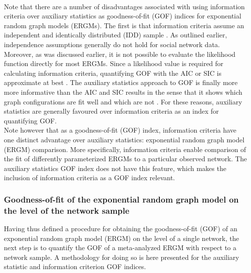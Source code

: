 \documentclass[a4paper, man]{apa6}
\begin{document}
\\
Note that there are a number of disadvantages associated with using information criteria over auxiliary statistics as goodness-of-fit (GOF) indices for exponential random graph models (ERGMs). The first is that information criteria assume an independent and identically distributed (IDD) sample \cite{wit2012all}. As outlined earlier, independence assumptions generally do not hold for social network data. Moreover, as was discussed earlier, it is not possible to evaluate the likelihood function directly for most ERGMs. Since a likelihood value is required for calculating information criteria, quantifying GOF with the AIC or SIC is approximate at best \cite{wit2012all}. The auxiliary statistics approach to GOF is finally more more informative than the AIC and SIC results in the sense that it shows which graph configurations are fit well and which are not \cite{wit2012all}. For these reasons, auxiliary statistics are generally favoured over information criteria as an index for quantifying GOF. 
\\
Note however that as a goodness-of-fit (GOF) index, information criteria have one distinct advantage over auxiliary statistics: exponential random graph model (ERGM) comparison. More specifically, information criteria enable comparison of the fit of differently parameterized ERGMs to a particular observed network. The auxiliary statistics GOF index does not have this feature, which makes the inclusion of information criteria as a GOF index relevant. 
\\
\subsubsection{Goodness-of-fit of the exponential random graph model on the level of the network sample}
Having thus defined a procedure for obtaining the goodness-of-fit (GOF) of an exponential random graph model (ERGM) on the level of a single network, the next step is to quantify the GOF of a meta-analyzed ERGM with respect to a network sample. A methodology for doing so is here presented for the auxiliary statistic and information criterion GOF indices. 
\\
\end{document}
